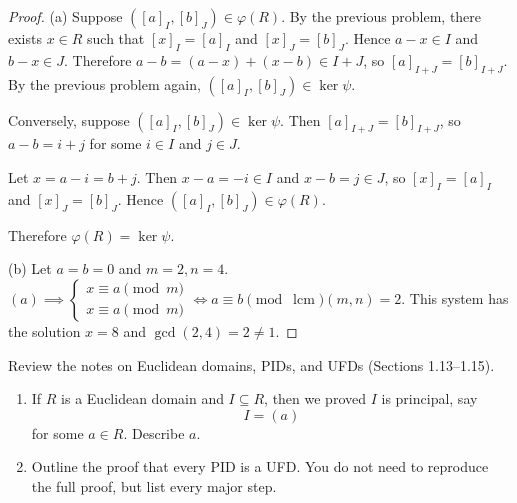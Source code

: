 \documentclass[addpoints,10pt]{exam}
\theoremstyle{plain}
\theoremstyle{definition}
\newtheorem{prob}[thm]{Problem}
\theoremstyle{plain}
\theoremstyle{definition}
\let\oldprob\prob
\let\endoldprob\endprob
\renewenvironment{prob}
  {\begin{singlespace}\oldprob}
  {\endoldprob\end{singlespace}}
\DeclareMathOperator{\lcm}{lcm}
\begin{document}
\begin{proof}
(a)
Suppose
$([a]_I,[b]_J)\in\varphi(R)$.
By the previous problem, there exists $x\in R$ such that
$[x]_I=[a]_I$
and
$[x]_J=[b]_J$.
Hence
$a-x\in I$
and
$b-x\in J$.
Therefore
$a-b=(a-x)+(x-b)\in I+J$,
so
$[a]_{I+J}=[b]_{I+J}$.
By the previous problem again,
$([a]_I,[b]_J)\in\ker\psi$.

Conversely, suppose
$([a]_I,[b]_J)\in\ker\psi$.
Then
$[a]_{I+J}=[b]_{I+J}$,
so
$a-b=i+j$
for some $i\in I$ and $j\in J$.

Let
$x=a-i=b+j$.
Then
$x-a=-i\in I$
and
$x-b=j\in J$,
so
$[x]_I=[a]_I$
and
$[x]_J=[b]_J$.
Hence
$([a]_I,[b]_J)\in\varphi(R)$.

Therefore
$\varphi(R)=\ker\psi$.

(b)
Let $a=b=0$ and $m=2,n=4$. $(a)\implies \begin{cases} x\equiv a\pmod m\\ x\equiv a\pmod m\end{cases}\iff a\equiv b\pmod \lcm(m,n)=2.$ This system has the solution $x=8$ and $\gcd(2,4)=2\neq 1$.

\end{proof}

\newpage
\begin{prob}
Review the notes on Euclidean domains, PIDs, and UFDs (Sections 1.13--1.15).

\begin{enumerate}[label=(\alph*)]
\item If $R$ is a Euclidean domain and $I\subseteq R$, then we proved $I$ is principal, say
\[
I=(a)
\]
for some $a\in R$. Describe $a$.

\item Outline the proof that every PID is a UFD. You do not need to reproduce the full proof, but list every major step.
\end{enumerate}
\end{prob}
\end{document}
